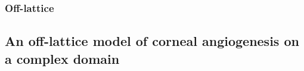 \documentclass[superscriptaddress, a4paper]{article}
\begin{document}
\subsubsection{Off-lattice}
\label{sec:off-lattice vascular tumour growth}



\subsection{An off-lattice model of corneal angiogenesis on a complex domain}
\label{sec:an off-lattice model of corneal angiogenesis on a complex domain}
\end{document}

